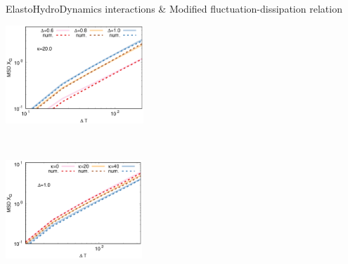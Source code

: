 \begin{frame}[fragile]{ \\ 
\small{ElastoHydroDynamics interactions \& Modified fluctuation-dissipation relation}}

\begin{minipage}{0.45\linewidth}
\begin{center}
\includegraphics[height=3.7cm]{figs/msd_x-k20-2.eps}
\end{center}
\end{minipage}
\begin{minipage}{0.05\linewidth}
	\ \\
\end{minipage}
\begin{minipage}{0.45\linewidth}
\begin{center}
\includegraphics[height=3.7cm]{figs/msd_x-d1k2.eps}
\end{center}
\end{minipage}



\end{frame}
